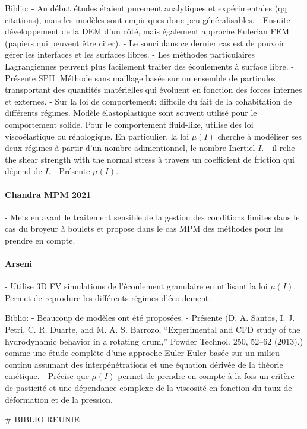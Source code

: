 Biblio:
- Au début études étaient purement analytiques et expérimentales (qq citations), mais les modèles sont empiriques donc peu généralisables.
- Ensuite développement de la DEM d'un côté, mais également approche Eulerian FEM (papiers qui peuvent être citer).
- Le souci dans ce dernier cas est de pouvoir gérer les interfaces et les surfaces libres.
- Les méthodes particulaires Lagrangiennes peuvent plus facilement traiter des écoulements à surface libre.
- Présente SPH. Méthode sans maillage basée sur un ensemble de particules transportant des quantités matérielles qui évoluent en fonction des forces internes et externes.
- Sur la loi de comportement: difficile du fait de la cohabitation de différents régimes. Modèle élastoplastique sont souvent utilisé pour le comportement solide. Pour le comportement fluid-like, utilise des loi viscoélastique ou réhologique. En particulier, la loi $\mu (I)$ cherche à modéliser ses deux régimes à partir d'un nombre adimentionnel, le nombre Inertiel $I$.
- il relie the shear strength with the normal stress à travers un coefficient de friction qui dépend de $I$.
- Présente $\mu(I)$.

\paragraph*{Chandra MPM 2021}
- Mets en avant le traitement sensible de la gestion des conditions limites dans le cas du broyeur à boulets et propose dans le cas MPM des méthodes pour les prendre en compte.

\paragraph*{Arseni}
- Utilise 3D FV simulations de l'écoulement granulaire en utilisant la loi $\mu(I)$. Permet de reprodure les différents régimes d'écoulement.

Biblio:
- Beaucoup de modèles ont été proposées.
- Présente (D. A. Santos, I. J. Petri, C. R. Duarte, and M. A. S. Barrozo, “Experimental and CFD study of the hydrodynamic behavior in a rotating drum,” Powder Technol. 250, 52–62 (2013).) comme une étude complète d'une approche Euler-Euler basée sur un milieu continu assumant des interpénétrations et une équation dérivée de la théorie cinétique.
- Précise que $\mu(I)$ permet de prendre en compte à la fois un critère de pasticité et une dépendance complexe de la viscosité en fonction du taux de déformation et de la pression.

# BIBLIO REUNIE

